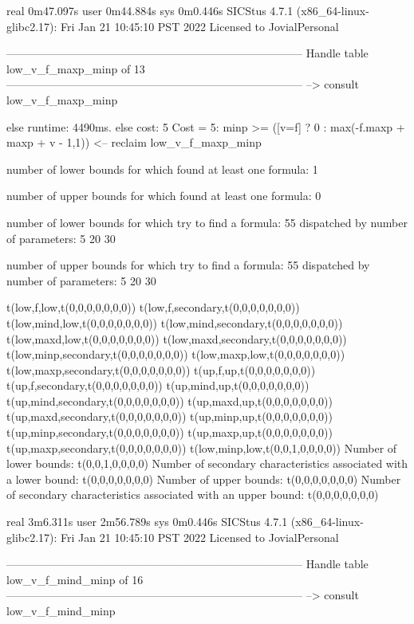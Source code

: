 real	0m47.097s
user	0m44.884s
sys	0m0.446s
SICStus 4.7.1 (x86_64-linux-glibc2.17): Fri Jan 21 10:45:10 PST 2022
Licensed to JovialPersonal


--------------------------------------------------------------------------------
Handle table low_v_f_maxp_minp of 13
--------------------------------------------------------------------------------
--> consult low_v_f_maxp_minp

else runtime: 4490ms. else cost: 5
Cost =  5:  minp >= ([v=f] ? 0 : max(-f.maxp + maxp + v - 1,1)) %
<-- reclaim low_v_f_maxp_minp

number of lower bounds for which found at least one formula: 1

number of upper bounds for which found at least one formula: 0

number of lower bounds for which try to find a formula: 55
dispatched by number of parameters: 5  20  30

number of upper bounds for which try to find a formula: 55
dispatched by number of parameters: 5  20  30

t(low,f,low,t(0,0,0,0,0,0,0))
t(low,f,secondary,t(0,0,0,0,0,0,0))
t(low,mind,low,t(0,0,0,0,0,0,0))
t(low,mind,secondary,t(0,0,0,0,0,0,0))
t(low,maxd,low,t(0,0,0,0,0,0,0))
t(low,maxd,secondary,t(0,0,0,0,0,0,0))
t(low,minp,secondary,t(0,0,0,0,0,0,0))
t(low,maxp,low,t(0,0,0,0,0,0,0))
t(low,maxp,secondary,t(0,0,0,0,0,0,0))
t(up,f,up,t(0,0,0,0,0,0,0))
t(up,f,secondary,t(0,0,0,0,0,0,0))
t(up,mind,up,t(0,0,0,0,0,0,0))
t(up,mind,secondary,t(0,0,0,0,0,0,0))
t(up,maxd,up,t(0,0,0,0,0,0,0))
t(up,maxd,secondary,t(0,0,0,0,0,0,0))
t(up,minp,up,t(0,0,0,0,0,0,0))
t(up,minp,secondary,t(0,0,0,0,0,0,0))
t(up,maxp,up,t(0,0,0,0,0,0,0))
t(up,maxp,secondary,t(0,0,0,0,0,0,0))
t(low,minp,low,t(0,0,1,0,0,0,0))
Number of lower bounds:                                             t(0,0,1,0,0,0,0)
Number of secondary characteristics associated with a lower bound:  t(0,0,0,0,0,0,0)
Number of upper bounds:                                             t(0,0,0,0,0,0,0)
Number of secondary characteristics associated with an upper bound: t(0,0,0,0,0,0,0)

real	3m6.311s
user	2m56.789s
sys	0m0.446s
SICStus 4.7.1 (x86_64-linux-glibc2.17): Fri Jan 21 10:45:10 PST 2022
Licensed to JovialPersonal


--------------------------------------------------------------------------------
Handle table low_v_f_mind_minp of 16
--------------------------------------------------------------------------------
--> consult low_v_f_mind_minp

